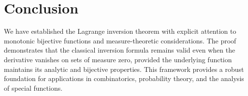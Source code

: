 \documentclass{article}
\begin{document}
\section{Conclusion}

We have established the Lagrange inversion theorem with explicit attention to
monotonic bijective functions and measure-theoretic considerations. The proof
demonstrates that the classical inversion formula remains valid even when the
derivative vanishes on sets of measure zero, provided the underlying function
maintains its analytic and bijective properties. This framework provides a
robust foundation for applications in combinatorics, probability theory, and
the analysis of special functions.
\end{document}
